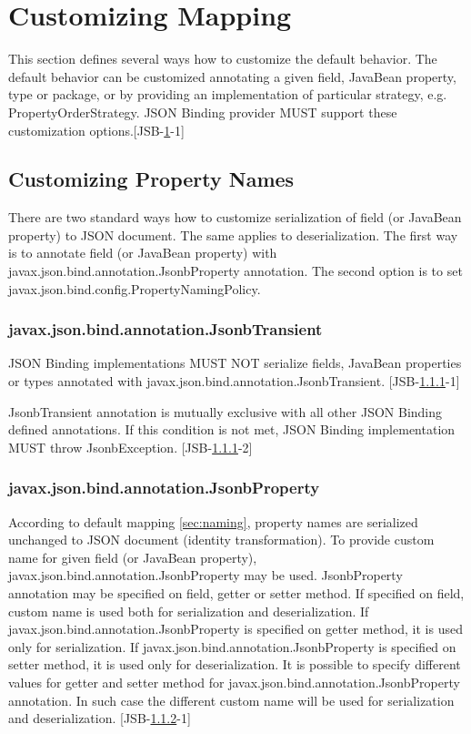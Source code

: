 \chapter{Customizing Mapping}
\label{customization}

This section defines several ways how to customize the default behavior. The default behavior can be customized annotating a given field, JavaBean property, type or package, or by providing an implementation of particular strategy, e.g. PropertyOrderStrategy. JSON Binding provider MUST support these customization options.[JSB-\ref{customization}-1]

\section{Customizing Property Names}
\label{sec:custom_property_names}

There are two standard ways how to customize serialization of field (or JavaBean property) to JSON document. The same applies to deserialization. The first way is to annotate field (or JavaBean property) with javax.json.bind.annotation.JsonbProperty annotation. The second option is to set javax.json.bind.config.PropertyNamingPolicy.

\subsection{javax.json.bind.annotation.JsonbTransient}
\label{subsec:JsonbTransient}

JSON Binding implementations MUST NOT serialize fields, JavaBean properties or types annotated with javax.json.bind.annotation.JsonbTransient. [JSB-\ref{subsec:JsonbTransient}-1]

JsonbTransient annotation is mutually exclusive with all other JSON Binding defined annotations. If this condition is not met, JSON Binding implementation MUST throw JsonbException. [JSB-\ref{subsec:JsonbTransient}-2]

\subsection{javax.json.bind.annotation.JsonbProperty}
\label{subsec:JsonbProperty}

According to default mapping \ref{sec:naming}, property names are serialized unchanged to JSON document (identity transformation). To provide custom name for given field (or JavaBean property), javax.json.bind.annotation.JsonbProperty may be used. JsonbProperty annotation may be specified on field, getter or setter method. If specified on field, custom name is used both for serialization and deserialization. If javax.json.bind.annotation.JsonbProperty is specified on getter method, it is used only for serialization. If javax.json.bind.annotation.JsonbProperty is specified on setter method, it is used only for deserialization. It is possible to specify different values for getter and setter method for javax.json.bind.annotation.JsonbProperty annotation. In such case the different custom name will be used for serialization and deserialization. [JSB-\ref{subsec:JsonbProperty}-1]

